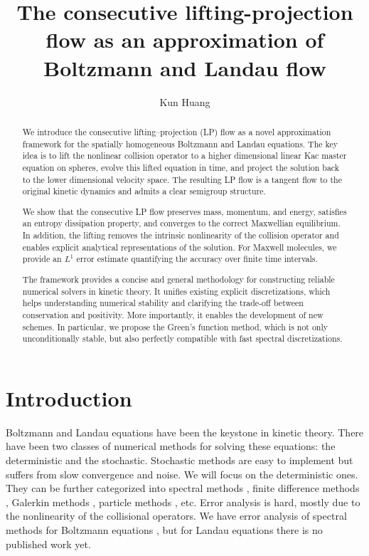 \documentclass{article}
\title{The consecutive lifting-projection flow as an approximation of Boltzmann and Landau flow}
\author[1]{Kun Huang}
\affil[1]{Department of Mathematics, Virginia Tech}
\date{}
\numberwithin{equation}{section}
\begin{document}
\maketitle

\begin{abstract}
    We introduce the consecutive lifting–projection (LP) flow as a novel approximation framework for the spatially homogeneous Boltzmann and Landau equations. The key idea is to lift the nonlinear collision operator to a higher dimensional linear Kac master equation on spheres, evolve this lifted equation in time, and project the solution back to the lower dimensional velocity space. The resulting LP flow is a tangent flow to the original kinetic dynamics and admits a clear semigroup structure.
    
    We show that the consecutive LP flow preserves mass, momentum, and energy, satisfies an entropy dissipation property, and converges to the correct Maxwellian equilibrium. In addition, the lifting removes the intrinsic nonlinearity of the collision operator and enables explicit analytical representations of the solution. For Maxwell molecules, we provide an $L^1$ error estimate quantifying the accuracy over finite time intervals.

    The framework provides a concise and general methodology for constructing reliable numerical solvers in kinetic theory. It unifies existing explicit discretizations, which helps understanding numerical stability and clarifying the trade-off between conservation and positivity. More importantly, it enables the development of new schemes. In particular, we propose the Green's function method, which is not only unconditionally stable, but also perfectly compatible with fast spectral discretizations.
\end{abstract}



\section{Introduction}
Boltzmann and Landau equations have been the keystone in kinetic theory. There have been two classes of numerical methods for solving these equations: the deterministic and the stochastic. Stochastic methods are easy to implement but suffers from slow convergence and noise. We will focus on the deterministic ones. They can be further categorized into spectral methods \cite{gamba2009spectral, gamba2017fast, pareschi2000fast, zhang2017conservative}, finite difference methods \cite{TAITANO2015357, shiroto2019structure}, Galerkin methods \cite{gamba2018galerkin}, particle methods \cite{carrillo2020particle,bailo2024collisional}, etc. Error analysis is hard, mostly due to the nonlinearity of the collisional operators. We have error analysis of spectral methods for Boltzmann equations \cite{filbet2011analysis,alonso2018convergence, hu2021new}, but for Landau equations there is no published work yet. 
\end{document}
